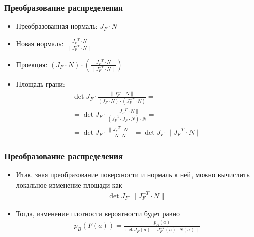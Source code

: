 \documentclass[handout,10pt]{beamer}
\begin{document}
\begin{frame}
\frametitle{Преобразование распределения}
\begin{itemize}
\item Преобразованная нормаль: \begin{math}J_F \cdot N\end{math}
\pause
\item Новая нормаль: \begin{math}\frac{J_F^{-T}\cdot N}{\|J_F^{-T}\cdot N\|}\end{math}
\pause
\item Проекция: \begin{math}(J_F\cdot N) \cdot \left(\frac{J_F^{-T}\cdot N}{\|J_F^{-T}\cdot N\|}\right)\end{math}
\pause
\item Площадь грани:
\begin{gather*}
\det J_F \cdot \frac{\|J_F^{-T}\cdot N\|}{(J_F\cdot N) \cdot (J_F^{-T}\cdot N)} = \\
= \det J_F \cdot \frac{\|J_F^{-T}\cdot N\|}{(J_F^{-1} \cdot J_F\cdot N) \cdot N} = \\
= \det J_F \cdot \frac{\|J_F^{-T}\cdot N\|}{N \cdot N} = \det J_F \cdot \|J_F^{-T}\cdot N\|
\end{gather*}
\end{itemize}
\end{frame}

\begin{frame}
\frametitle{Преобразование распределения}
\begin{itemize}
\item Итак, зная преобразование поверхности и нормаль к ней, можно вычислить локальное изменение площади как
\begin{gather*}
\det J_F \cdot \|J_F^{-T}\cdot N\|
\end{gather*}
\pause
\item Тогда, изменение плотности вероятности будет равно
\begin{gather*}
p_B(F(a)) = \frac{p_A(a)}{\det J_F(a) \cdot \|J_F^{-T}(a)\cdot N(a)\|}
\end{gather*}
\end{itemize}
\end{frame}
\end{document}
